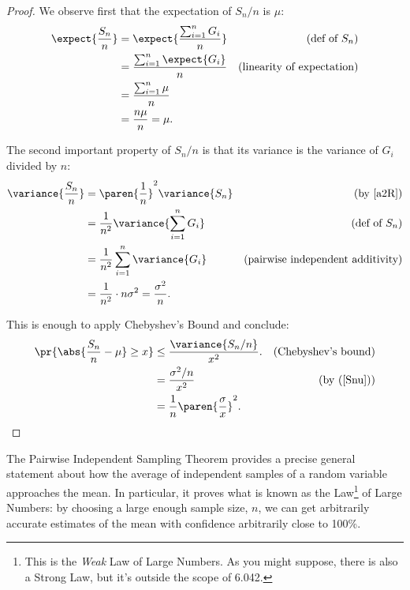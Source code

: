 \begin{proof}
We observe first that the expectation of $S_n/n$ is $\mu$:
\begin{align*}
\expect{\frac{S_n}{n}} & = \expect{\frac{\sum_{i=1}^n G_i}{n}}
         & \text{(def of $S_n$)}\\
 & = \frac{\sum_{i=1}^n \expect{G_i}}{n} 
     & \text{(linearity of expectation)}\\
 & = \frac{\sum_{i=1}^n \mu}{n}\\
 & = \frac{n\mu}{n} = \mu.
\end{align*}

The second important property of $S_n/n$ is that its variance is the
variance of $G_i$ divided by $n$:
\begin{align}
\variance{\frac{S_n}{n}} & =  \paren{\frac{1}{n}}^2 \variance{S_n}
          & \mbox{(by~\eqref{a2R})}\notag\\
 & =  \frac{1}{n^2} \variance{\sum_{i=1}^n G_i} 
          & \text{(def of $S_n$)}\notag\\
 & =  \frac{1}{n^2} \sum_{i=1}^n \variance{G_i}
        & \text{(pairwise independent additivity)}\notag\\
 & =  \frac{1}{n^2}\cdot n\sigma^2 =  \frac{\sigma^2}{n}.\label{Snu}
\end{align}

This is enough to apply Chebyshev's Bound and conclude:
\begin{align*}
\pr{\abs{\frac{S_n}{n} - \mu} \geq x} & \leq \frac{\variance{S_n/n}}{x^2}.
       & \text{(Chebyshev's bound)}\\
    & = \frac{\sigma^2/n}{x^2} & \text{(by~(\ref{Snu}))}\\
    & = \frac{1}{n} \paren{\frac{\sigma}{x}}^2.
\end{align*}

\end{proof}

The Pairwise Independent Sampling Theorem provides a precise general
statement about how the average of independent samples of a random
variable approaches the mean.  In particular, it proves what is known as
the Law\footnote{This is the \emph{Weak} Law of Large Numbers.  As you
might suppose, there is also a Strong Law, but it's outside the scope of
6.042.} of Large Numbers: by choosing a large enough sample size, $n$, we
can get arbitrarily accurate estimates of the mean with confidence
arbitrarily close to 100\%.




\endinput
